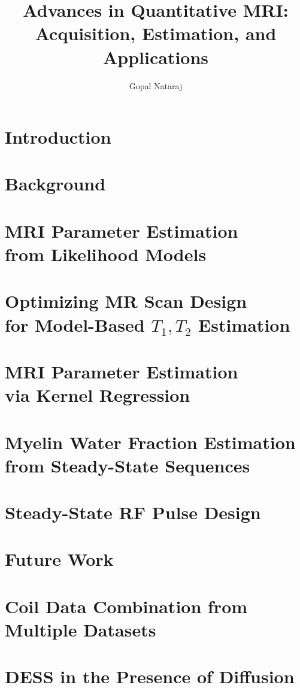 \documentclass[thesis]{../cls/thesis-umich}
\title{
	Advances in Quantitative MRI: \\
	Acquisition,
	Estimation,
	and 
	Applications
}
\author{Gopal Nataraj}
\begin{document}
\chapter{Introduction}
\label{c,intro}


\chapter{Background}
\label{c,bkgrd}


\chapter{MRI Parameter Estimation \\ from Likelihood Models}
\label{c,relax}


\chapter{Optimizing MR Scan Design \\ for Model-Based $T_1,T_2$ Estimation}
\label{c,scn-dsgn}


\chapter{MRI Parameter Estimation \\ via Kernel Regression}
\label{c,krr}


\chapter{Myelin Water Fraction Estimation \\ from Steady-State Sequences}
\label{c,mwf}


\chapter{Steady-State RF Pulse Design}
\label{c,ss-rf}


\chapter{Future Work}
\label{c,future}


\appendix
\chapter{Coil Data Combination from Multiple Datasets}
\label{a,cc-multi}


\chapter{DESS in the Presence of Diffusion}
\label{a,dess-diff}




\end{document}
